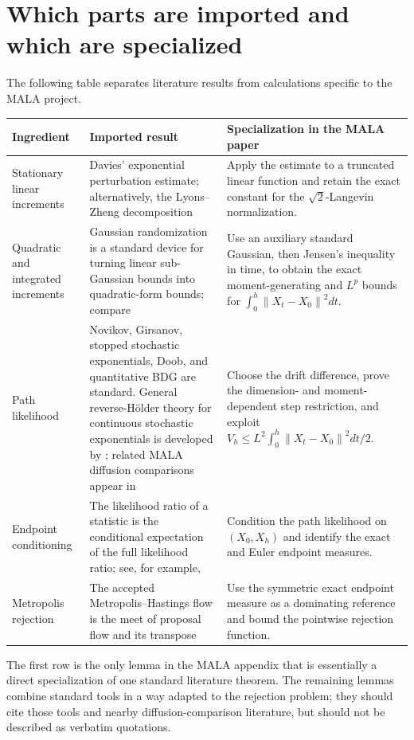 \documentclass[11pt]{article}
\newcommand{\norm}[1]{\left\lVert #1\right\rVert}
\newcommand{\1}{\mathbf 1}
\begin{document}
\section{Which parts are imported and which are specialized}\label{sec:status}

The following table separates literature results from calculations specific
to the MALA project.

\begin{center}
\begin{tabularx}{\textwidth}{>{\raggedright\arraybackslash}p{}
>{\raggedright\arraybackslash}X
>{\raggedright\arraybackslash}X}
\toprule
Ingredient & Imported result & Specialization in the MALA paper \\
\midrule
Stationary linear increments
& Davies' exponential perturbation estimate; alternatively, the
Lyons--Zheng decomposition
& Apply the estimate to a truncated linear function and retain the exact
constant for the \(\sqrt2\)-Langevin normalization. \\
\addlinespace
Quadratic and integrated increments
& Gaussian randomization is a standard device for turning linear
sub-Gaussian bounds into quadratic-form bounds; compare
\citet[Theorem~1 and Remark~2]{HsuKakadeZhang2012}
& Use an auxiliary standard Gaussian, then Jensen's inequality in time, to
obtain the exact moment-generating and \(L^p\) bounds for
\(\int_0^h\norm{X_t-X_0}^2dt\). \\
\addlinespace
Path likelihood
& Novikov, Girsanov, stopped stochastic exponentials, Doob, and
quantitative BDG are standard.  General reverse-H\"older theory for
continuous stochastic exponentials is developed by
\citet{Kazamaki1994}; related MALA diffusion comparisons appear in
\citet[Appendix~A]{ChewiEtAl2021}
& Choose the drift difference, prove the dimension- and moment-dependent
step restriction, and exploit
\(V_h\leq L^2\int_0^h\norm{X_t-X_0}^2dt/2\). \\
\addlinespace
Endpoint conditioning
& The likelihood ratio of a statistic is the conditional expectation of
the full likelihood ratio; see, for example, \citet{Kallenberg2021}
& Condition the path likelihood on \((X_0,X_h)\) and identify the exact and
Euler endpoint measures. \\
\addlinespace
Metropolis rejection
& The accepted Metropolis--Hastings flow is the meet of proposal flow and
its transpose \citep{Tierney1998,BilleraDiaconis2001}
& Use the symmetric exact endpoint measure as a dominating reference and
bound the pointwise rejection function. \\
\bottomrule
\end{tabularx}
\end{center}

The first row is the only lemma in the MALA appendix that is essentially a
direct specialization of one standard literature theorem.  The remaining
lemmas combine standard tools in a way adapted to the rejection problem;
they should cite those tools and nearby diffusion-comparison literature,
but should not be described as verbatim quotations.

\printbibliography
\end{document}
